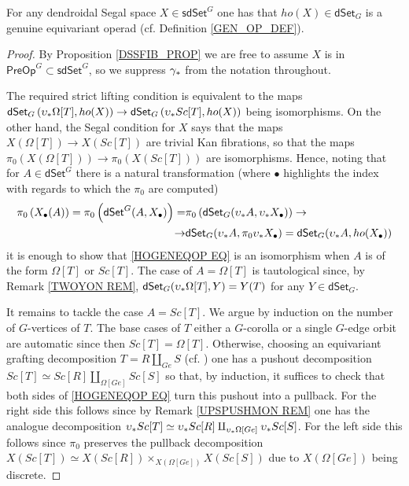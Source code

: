 \documentclass[a4paper,10pt
 ,draft
]{article}%
\begin{document}
\begin{proposition}
      \label{HMTPYGEN PROP}
For any dendroidal Segal space $X \in \mathsf{sdSet}^G$ one has that 
$ho(X) \in \mathsf{dSet}_G$ is a genuine equivariant operad (cf. Definition \ref{GEN_OP_DEF}).
\end{proposition}

\begin{proof}
By Proposition \ref{DSSFIB_PROP} we are free to assume 
$X$ is in $\mathsf{PreOp}^G \subset \mathsf{sdSet}^G$, so we suppress $\gamma_{\**}$ from the notation throughout.

The required strict lifting condition is equivalent to the 
 maps
$\mathsf{dSet}_G\left(\upsilon_{\**}\Omega[T], ho(X)\right)
\to
\mathsf{dSet}_G\left(\upsilon_{\**}Sc[T], ho(X)\right)$
being isomorphisms.
On the other hand, the Segal condition for $X$ says that the maps 
$X(\Omega[T]) \to X(Sc[T])$
are trivial Kan fibrations, so that the maps 
$\pi_0\left(X(\Omega[T])\right) \to \pi_0\left(X(Sc[T])\right)$
are isomorphisms. 
Hence, noting that
for $A \in \mathsf{dSet}^G$
there is a natural transformation
(where $\bullet$ highlights the index with regards to which the $\pi_0$ are computed)
\begin{equation}\label{HOGENEQOP EQ}
\begin{split}
	\pi_0\left( X_{\bullet}(A) \right)=
	\pi_0 \left(
	\mathsf{dSet}^G(A,X_{\bullet})
	\right)
= &
	\pi_0 \left(
	\mathsf{dSet}_G(\upsilon_{\**} A,\upsilon_{\**} X_{\bullet})
	\right)
\to 
\\
\to &
	\mathsf{dSet}_G(\upsilon_{\**} A,\pi_0 \upsilon_{\**} X_{\bullet})
=
	\mathsf{dSet}_G(\upsilon_{\**} A,ho(X_{\bullet}))
\end{split}
\end{equation}
it is enough to show that \eqref{HOGENEQOP EQ}
is an isomorphism when $A$ is of the form $\Omega[T]$ or $Sc[T]$.
The case of $A=\Omega[T]$
is tautological since, by Remark \ref{TWOYON REM},
$\mathsf{dSet}_G(\upsilon_{\**}\Omega[T],Y) = Y(T)$
for any $Y \in \mathsf{dSet}_G$. 

It remains to tackle the case $A=Sc[T]$.
We argue by induction on the number of $G$-vertices of $T$.
The base cases of $T$ either a $G$-corolla or a single $G$-edge orbit are automatic since then $Sc[T] = \Omega[T]$.
Otherwise, choosing an equivariant grafting decomposition
$T = R \amalg_{Ge} S$ (cf. \cite[(5.18) and Prop. 6.19]{Per18})
one has a pushout decomposition
$Sc[T] \simeq Sc[R] \amalg_{\Omega[Ge]} Sc[S]$
so that, by induction, it suffices to check that both sides of 
\eqref{HOGENEQOP EQ} turn this pushout into a pullback.
For the right side this follows since by 
Remark \ref{UPSPUSHMON REM}
one has the analogue decomposition
$\upsilon_{\**} Sc[T] \simeq \upsilon_{\**} Sc[R] \amalg_{\upsilon_{\**}\Omega[Ge]} \upsilon_{\**} Sc[S]$.
For the left side this follows since $\pi_0$
preserves the pullback decomposition
$X(Sc[T]) \simeq X(Sc[R]) \times_{X(\Omega[Ge])} X(Sc[S])$ due to
$X(\Omega[Ge])$ being discrete.
\end{proof}
\end{document}
